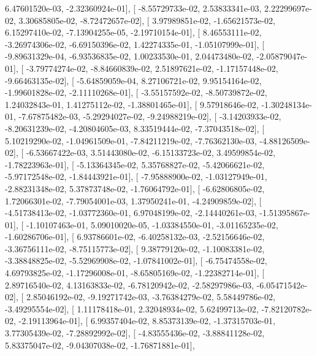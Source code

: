 \documentclass{article}
\begin{document}
          6.47601520e-03,  -2.32360924e-01],
       [ -8.55729733e-02,   2.53833341e-03,   2.22299697e-02,
          3.30685805e-02,  -8.72472657e-02],
       [  3.97989851e-02,  -1.65621573e-02,   6.15297410e-02,
         -7.13904255e-05,  -2.19710154e-01],
       [  8.46553111e-02,  -3.26974306e-02,  -6.69150396e-02,
          1.42274335e-01,  -1.05107999e-01],
       [ -9.89631329e-04,  -6.93536835e-02,   1.00233530e-01,
          2.04473480e-02,  -2.05879047e-01],
       [ -3.79774274e-02,  -8.84660839e-02,   2.51897621e-02,
         -1.17157448e-02,  -9.66463135e-02],
       [ -5.64859059e-04,   8.27106721e-02,   9.95154164e-02,
         -1.99601828e-02,  -2.11110268e-01],
       [ -3.55157592e-02,  -8.50739872e-02,   1.24032843e-01,
          1.41275112e-02,  -1.38801465e-01],
       [  9.57918646e-02,  -1.30248134e-01,  -7.67875482e-03,
         -5.29294027e-02,  -9.24988219e-02],
       [ -3.14203933e-02,  -8.20631239e-02,  -4.20804605e-03,
          8.33519444e-02,  -7.37043518e-02],
       [  5.10219290e-02,  -1.04961509e-01,  -7.84211219e-02,
         -7.76362130e-03,  -4.88126509e-02],
       [ -6.53667422e-03,   3.51443080e-02,  -6.15133723e-02,
          3.49599854e-02,  -1.78223963e-01],
       [ -5.13364345e-02,   5.35768827e-02,  -5.42066621e-02,
         -5.97172548e-02,  -1.84443921e-01],
       [ -7.95888900e-02,  -1.03127949e-01,  -2.88231348e-02,
          5.37873748e-02,  -1.76064792e-01],
       [ -6.62806805e-02,   1.72066301e-02,  -7.79054001e-03,
          1.37950241e-01,  -4.24909859e-02],
       [ -4.51738413e-02,  -1.03772360e-01,   6.97048199e-02,
         -2.14440261e-03,  -1.51395867e-01],
       [ -1.10107463e-01,   5.09010020e-05,  -1.03384550e-01,
         -3.01165235e-02,  -1.60286706e-01],
       [  6.93786601e-02,  -6.40258132e-03,  -2.52156646e-02,
         -3.36756111e-02,  -8.75115773e-02],
       [  9.38779120e-02,  -1.10083381e-02,  -3.38848825e-02,
         -5.52969908e-02,  -1.07841002e-01],
       [ -6.75474558e-02,   4.69793825e-02,  -1.17296008e-01,
         -8.65805169e-02,  -1.22382714e-01],
       [  2.89716540e-02,   4.13163833e-02,  -6.78120942e-02,
         -2.58297986e-03,  -6.05471542e-02],
       [  2.85046192e-02,  -9.19271742e-03,  -3.76384279e-02,
          5.58449786e-02,  -3.49295554e-02],
       [  1.11178418e-01,   2.32048934e-02,   5.62499713e-02,
         -7.82120782e-02,  -2.19113964e-01],
       [  6.99357404e-02,   8.85373139e-02,  -1.37315703e-01,
          3.77305439e-02,  -7.28892992e-02],
       [ -4.83555436e-02,  -3.88841128e-02,   5.83375047e-02,
         -9.04307038e-02,  -1.76871881e-01],
\end{document}
